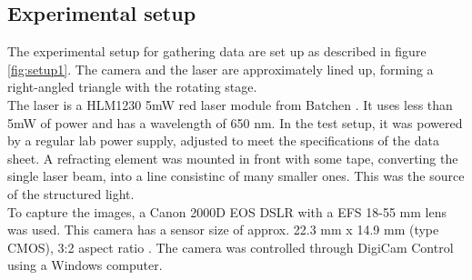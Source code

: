  

\subsection{Experimental setup}
\label{sec:experimental setup}
The experimental setup for gathering data are set up as described in figure \ref{fig:setup1}. The camera and the laser are approximately lined up, forming a right-angled triangle with the rotating stage.\\

The laser is a HLM1230 5mW red laser module from Batchen \cite{laserDatasheet}. It uses less than 5mW of power and has a wavelength of 650 nm. In the test setup, it was powered by a regular lab power supply, adjusted to meet the specifications of the data sheet. A refracting element was mounted in front with some tape, converting the single laser beam, into a line consistinc of many smaller ones. This was the source of the structured light. \\

To capture the images, a Canon 2000D EOS DSLR with a EFS 18-55 mm lens was used. This camera has a sensor size of approx. 22.3 mm x 14.9 mm (type CMOS), 3:2 aspect ratio \cite{canonCamera}. The camera was controlled through DigiCam Control using a Windows computer. \\

